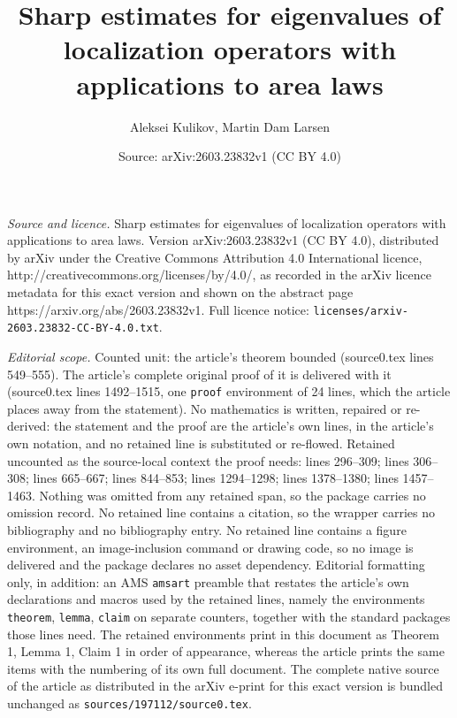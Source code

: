 \documentclass[10pt,a4paper]{amsart}
\title{Sharp estimates for eigenvalues of localization operators with applications to area laws}
\author{Aleksei Kulikov, Martin Dam Larsen}
\date{Source: arXiv:2603.23832v1 (CC BY 4.0)}
\begin{document}
\maketitle

\noindent\emph{Source and licence.} Sharp estimates for eigenvalues of localization operators with applications to area laws. Version arXiv:2603.23832v1 (CC BY 4.0), distributed by arXiv under the Creative Commons Attribution 4.0 International licence, http://creativecommons.org/licenses/by/4.0/, as recorded in the arXiv licence metadata for this exact version and shown on the abstract page https://arxiv.org/abs/2603.23832v1. Full licence notice: \texttt{licenses/arxiv-2603.23832-CC-BY-4.0.txt}.\par\smallskip

\noindent\textit{Editorial scope.} Counted unit: the article's theorem bounded (source0.tex lines 549--555). The article's complete original proof of it is delivered with it (source0.tex lines 1492--1515, one \texttt{proof} environment of 24 lines, which the article places away from the statement). No mathematics is written, repaired or re-derived: the statement and the proof are the article's own lines, in the article's own notation, and no retained line is substituted or re-flowed.  Retained uncounted as the source-local context the proof needs: lines 296--309; lines 306--308; lines 665--667; lines 844--853; lines 1294--1298; lines 1378--1380; lines 1457--1463.  Nothing was omitted from any retained span, so the package carries no omission record.  No retained line contains a citation, so the wrapper carries no bibliography and no bibliography entry.  No retained line contains a figure environment, an image-inclusion command or drawing code, so no image is delivered and the package declares no asset dependency.  Editorial formatting only, in addition: an AMS \texttt{amsart} preamble that restates the article's own declarations and macros used by the retained lines, namely the environments \texttt{theorem}, \texttt{lemma}, \texttt{claim} on separate counters, together with the standard packages those lines need.  The retained environments print in this document as Theorem 1, Lemma 1, Claim 1 in order of appearance, whereas the article prints the same items with the numbering of its own full document.  The complete native source of the article as distributed in the arXiv e-print for this exact version is bundled unchanged as \texttt{sources/197112/source0.tex}.
\end{document}
